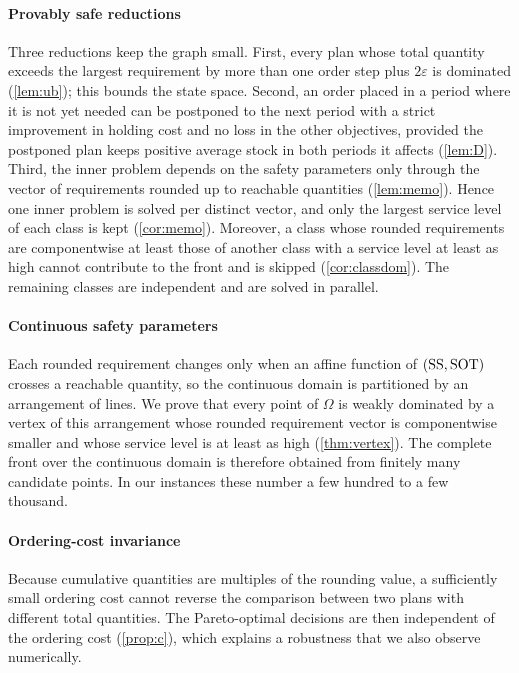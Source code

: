 \documentclass[preprint,12pt,authoryear]{elsarticle}
\begin{document}
\paragraph{Provably safe reductions}
Three reductions keep the graph small. First, every plan whose total quantity exceeds the
largest requirement by more than one order step plus $2\varepsilon$ is dominated
(\cref{lem:ub}); this bounds the state space. Second, an order placed in a period where
it is not yet needed can be postponed to the next period with a strict improvement in
holding cost and no loss in the other objectives, provided the postponed plan keeps
positive average stock in both periods it affects (\cref{lem:D}). Third, the inner
problem depends on the safety parameters only through the vector of requirements rounded
up to reachable quantities (\cref{lem:memo}). Hence one inner problem is solved per
distinct vector, and only the largest service level of each class is kept
(\cref{cor:memo}). Moreover, a class whose rounded requirements are componentwise at least
those of another class with a service level at least as high cannot contribute to the
front and is skipped (\cref{cor:classdom}). The remaining classes are independent and are
solved in parallel.

\paragraph{Continuous safety parameters}
Each rounded requirement changes only when an affine function of $(\mathrm{SS},\mathrm{SOT})$ crosses a
reachable quantity, so the continuous domain is partitioned by an arrangement of lines.
We prove that every point of $\Omega$ is weakly dominated by a vertex of this arrangement
whose rounded requirement vector is componentwise smaller and whose service level is at
least as high (\cref{thm:vertex}). The complete front over the continuous domain is
therefore obtained from finitely many candidate points. In our instances these number a
few hundred to a few thousand.

\paragraph{Ordering-cost invariance}
Because cumulative quantities are multiples of the rounding value, a sufficiently small
ordering cost cannot reverse the comparison between two plans with different total
quantities. The Pareto-optimal decisions are then independent of the ordering cost
(\cref{prop:c}), which explains a robustness that we also observe numerically.
\end{document}
